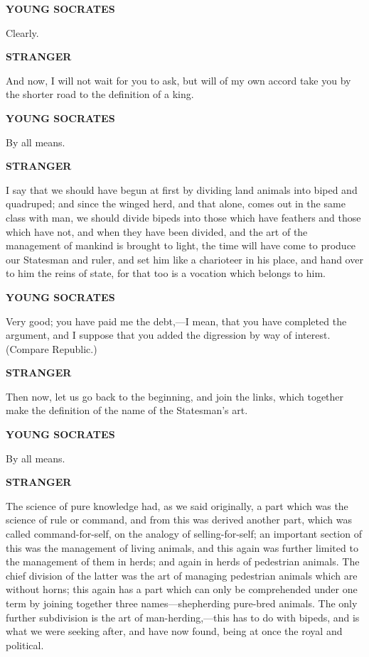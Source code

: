 \documentclass[11pt,letter]{article}
\begin{document}
\par \textbf{YOUNG SOCRATES}
\par   Clearly.

\par \textbf{STRANGER}
\par   And now, I will not wait for you to ask, but will of my own accord take you by the shorter road to the definition of a king.

\par \textbf{YOUNG SOCRATES}
\par   By all means.

\par \textbf{STRANGER}
\par   I say that we should have begun at first by dividing land animals into biped and quadruped; and since the winged herd, and that alone, comes out in the same class with man, we should divide bipeds into those which have feathers and those which have not, and when they have been divided, and the art of the management of mankind is brought to light, the time will have come to produce our Statesman and ruler, and set him like a charioteer in his place, and hand over to him the reins of state, for that too is a vocation which belongs to him.

\par \textbf{YOUNG SOCRATES}
\par   Very good; you have paid me the debt,—I mean, that you have completed the argument, and I suppose that you added the digression by way of interest. (Compare Republic.)

\par \textbf{STRANGER}
\par   Then now, let us go back to the beginning, and join the links, which together make the definition of the name of the Statesman's art.

\par \textbf{YOUNG SOCRATES}
\par   By all means.

\par \textbf{STRANGER}
\par   The science of pure knowledge had, as we said originally, a part which was the science of rule or command, and from this was derived another part, which was called command-for-self, on the analogy of selling-for-self; an important section of this was the management of living animals, and this again was further limited to the management of them in herds; and again in herds of pedestrian animals. The chief division of the latter was the art of managing pedestrian animals which are without horns; this again has a part which can only be comprehended under one term by joining together three names—shepherding pure-bred animals. The only further subdivision is the art of man-herding,—this has to do with bipeds, and is what we were seeking after, and have now found, being at once the royal and political.
\end{document}
